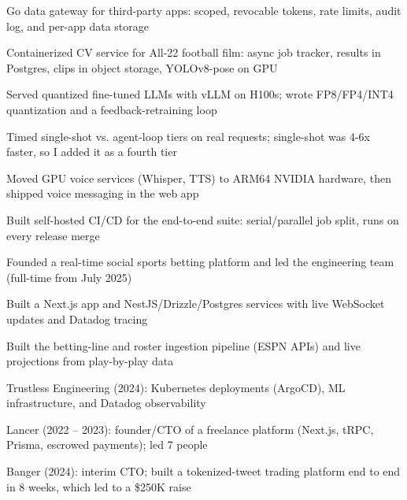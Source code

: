 \documentclass[print]{jack-resume}
\begin{document}
\begin{tightemize}
    \item Go data gateway for third-party apps: scoped, revocable tokens, rate limits, audit log, and per-app data storage
    \item Containerized CV service for All-22 football film: async job tracker, results in Postgres, clips in object storage, YOLOv8-pose on GPU
    \item Served quantized fine-tuned LLMs with vLLM on H100s; wrote FP8/FP4/INT4 quantization and a feedback-retraining loop
    \item Timed single-shot vs. agent-loop tiers on real requests; single-shot was 4-6x faster, so I added it as a fourth tier
    \item Moved GPU voice services (Whisper, TTS) to ARM64 NVIDIA hardware, then shipped voice messaging in the web app
    \item Built self-hosted CI/CD for the end-to-end suite: serial/parallel job split, runs on every release merge
\end{tightemize}
\sectionsep

\begin{tightemize}
    \item Founded a real-time social sports betting platform and led the engineering team (full-time from July 2025)
    \item Built a Next.js app and NestJS/Drizzle/Postgres services with live WebSocket updates and Datadog tracing
    \item Built the betting-line and roster ingestion pipeline (ESPN APIs) and live projections from play-by-play data
\end{tightemize}
\sectionsep

\begin{tightemize}
    \item Trustless Engineering (2024): Kubernetes deployments (ArgoCD), ML infrastructure, and Datadog observability
    \item Lancer (2022 -- 2023): founder/CTO of a freelance platform (Next.js, tRPC, Prisma, escrowed payments); led 7 people
    \item Banger (2024): interim CTO; built a tokenized-tweet trading platform end to end in 8 weeks, which led to a \$250K raise
\end{tightemize}
\sectionsep
\end{document}
